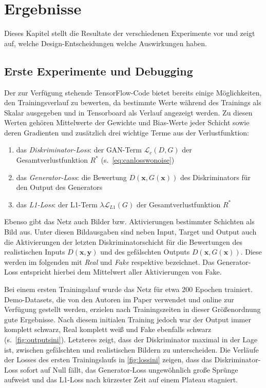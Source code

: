 \chapter{Ergebnisse}

Dieses Kapitel stellt die Resultate der verschiedenen Experimente vor und zeigt auf, welche Design-Entscheidungen welche Auswirkungen haben.



\section{Erste Experimente und Debugging}

Der zur Verfügung stehende TensorFlow-Code bietet bereits einige Möglichkeiten, den Trainingsverlauf zu bewerten, da bestimmte Werte während des Trainings als Skalar ausgegeben und in Tensorboard als Verlauf angezeigt werden.
Zu diesen Werten gehören Mittelwerte der Gewichte und Bias-Werte jeder Schicht sowie deren Gradienten und zusätzlich drei wichtige Terme aus der Verlustfunktion:

\begin{enumerate}
	\item das \emph{Diskriminator-Loss}: der GAN-Term $ \mathcal{L}_c(D, G) $ der Gesamtverlustfunktion $ R^* $ (s.~\autoref{eq:canlosswonoise})
	\item das \emph{Generator-Loss}: die Bewertung $ D(\mathbf{x}, G(\mathbf{x})) $ des Diskriminators für den Output des Generators
	\item das \emph{L1-Loss}: der L1-Term $ \lambda \mathcal{L}_{L1}(G) $ der Gesamtverlustfunktion $ R^* $
\end{enumerate}

Ebenso gibt das Netz auch Bilder bzw. Aktivierungen bestimmter Schichten als Bild aus.
Unter diesen Bildausgaben sind neben Input, Target und Output auch die Aktivierungen der letzten Diskriminatorschicht für die Bewertungen des realistischen Inputs $ D(\mathbf{x}, \mathbf{y}) $ und des gefälschten Outputs $ D(\mathbf{x}, G(\mathbf{x})) $.
Diese werden im folgenden mit \emph{Real} und \emph{Fake} respektive bezeichnet.
Das Generator-Loss entspricht hierbei dem Mittelwert aller Aktivierungen von Fake.

Bei einem ersten Trainingslauf wurde das Netz für etwa 200 Epochen trainiert.
Demo-Datasets, die von den Autoren im Paper verwendet und online zur Verfügung gestellt werden, erzielen nach Trainingszeiten in dieser Größenordnung gute Ergebnisse.
Nach diesem initialen Training jedoch war der Output immer komplett schwarz, Real komplett weiß und Fake ebenfalls schwarz (s.~\autoref{fig:outputsini}).
Letzteres zeigt, dass der Diskriminator maximal in der Lage ist, zwischen gefälschten und realistischen Bildern zu unterscheiden.
Die Verläufe der Losses des ersten Trainingslaufs in \autoref{fig:lossini} zeigen, dass das Diskriminator-Loss sofort auf Null fällt, das Generator-Loss ungewöhnlich große Sprünge aufweist und das L1-Loss nach kürzester Zeit auf einem Plateau stagniert.

